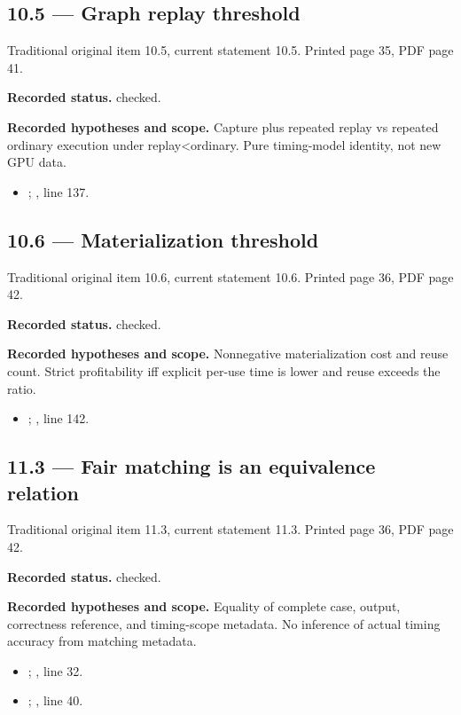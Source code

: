 \subsection{10.5 — Graph replay threshold}
\label{result:10.5}
{\footnotesize\color{muted}Traditional original item 10.5, current statement 10.5. Printed page 35, PDF page 41.}\par
\textbf{Recorded status.} checked.

\textbf{Recorded hypotheses and scope.} Capture plus repeated replay vs repeated ordinary execution under replay<ordinary. Pure timing-model identity, not new GPU data.

\begin{itemize}
\item {}; , line 137.
\end{itemize}
\subsection{10.6 — Materialization threshold}
\label{result:10.6}
{\footnotesize\color{muted}Traditional original item 10.6, current statement 10.6. Printed page 36, PDF page 42.}\par
\textbf{Recorded status.} checked.

\textbf{Recorded hypotheses and scope.} Nonnegative materialization cost and reuse count. Strict profitability iff explicit per-use time is lower and reuse exceeds the ratio.

\begin{itemize}
\item {}; , line 142.
\end{itemize}
\subsection{11.3 — Fair matching is an equivalence relation}
\label{result:11.3}
{\footnotesize\color{muted}Traditional original item 11.3, current statement 11.3. Printed page 36, PDF page 42.}\par
\textbf{Recorded status.} checked.

\textbf{Recorded hypotheses and scope.} Equality of complete case, output, correctness reference, and timing-scope metadata. No inference of actual timing accuracy from matching metadata.

\begin{itemize}
\item {}; , line 32.
\item {}; , line 40.
\end{itemize}
